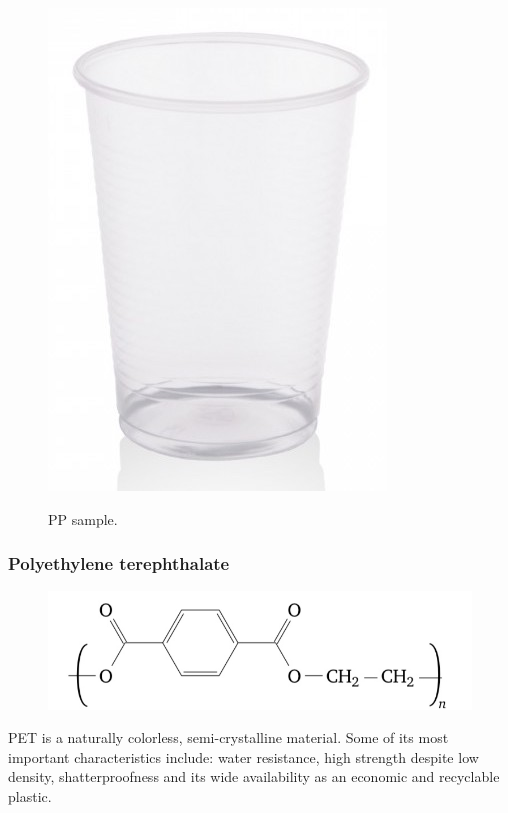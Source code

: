 \documentclass[a4paper, 11pt]{article}
\begin{document}
\begin{figure}[h!]
	\centering
	{\includegraphics[scale=0.18]{PP}}
	\captionsetup{justification=centering}
	\caption{PP sample.}
	\label{fig:PP}
\end{figure}

\newpage

\subsubsection{Polyethylene terephthalate}

\begin{figure}[htp]
	\centering
	{\includegraphics[scale=0.25]{pet_chem}}
	\captionsetup{justification=centering}
	\label{fig:PE}
\end{figure}

PET is a naturally colorless, semi-crystalline material. Some of its most important characteristics include: water resistance, high strength despite low density, shatterproofness and its wide availability as an economic and recyclable plastic.
\end{document}
